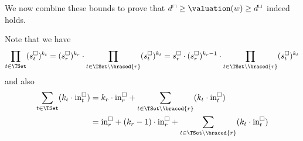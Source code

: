 We now combine these bounds to prove that $d^\sqcap \geq \valuation(w) \geq d^\sqcup$ indeed holds.

Note that we have
\[ \prod_{t \in \TSet} (s^\square_t)^{k_t} = (s^\square_r)^{k_r} \cdot \prod_{t \in \TSet \setminus \braced{r}} (s^\square_t)^{k_t} = s^\square_r \cdot (s^\square_r)^{k_r - 1} \cdot \prod_{t \in \TSet \setminus \braced{r}} (s^\square_t)^{k_t} \]
and also
\begin{align*}
  \sum_{t \in \TSet} (k_t \cdot \text{in}^\square_t)
  & = k_r \cdot \text{in}^\square_r + \sum_{t \in \TSet \setminus \braced{r}} (k_t \cdot \text{in}^\square_t) \\
  & = \text{in}^\square_r
    + (k_r - 1) \cdot \text{in}^\square_r
    + \sum_{t \in \TSet \setminus \braced{r}} (k_t \cdot \text{in}^\square_t)
\end{align*}

